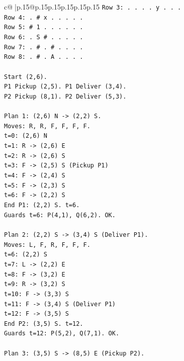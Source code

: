 \documentclass{article}
\begin{document}
{\begin{supertabular}{c@{$\;$}|p{.15\linewidth}@{}p{.15\linewidth}p{.15\linewidth}p{.15\linewidth}p{.15\linewidth}p{.15\linewidth}}
{{{\texttt{Row 3: . . . . y . . .} \\
\texttt{Row 4: . \# x . . . . .} \\
\texttt{Row 5: \# 1 . . . . . .} \\
\texttt{Row 6: . S \# . . . . .} \\
\texttt{Row 7: . \# . \# . . . .} \\
\texttt{Row 8: . \# . A . . . .} \\
\\ 
\texttt{Start (2,6).} \\
\texttt{P1 Pickup (2,5). P1 Deliver (3,4).} \\
\texttt{P2 Pickup (8,1). P2 Deliver (5,3).} \\
\\ 
\texttt{Plan 1: (2,6) N {-}> (2,2) S.} \\
\texttt{Moves: R, R, F, F, F, F.} \\
\texttt{t=0: (2,6) N} \\
\texttt{t=1: R {-}> (2,6) E} \\
\texttt{t=2: R {-}> (2,6) S} \\
\texttt{t=3: F {-}> (2,5) S (Pickup P1)} \\
\texttt{t=4: F {-}> (2,4) S} \\
\texttt{t=5: F {-}> (2,3) S} \\
\texttt{t=6: F {-}> (2,2) S} \\
\texttt{End P1: (2,2) S. t=6.} \\
\texttt{Guards t=6: P(4,1), Q(6,2). OK.} \\
\\ 
\texttt{Plan 2: (2,2) S {-}> (3,4) S (Deliver P1).} \\
\texttt{Moves: L, F, R, F, F, F.} \\
\texttt{t=6: (2,2) S} \\
\texttt{t=7: L {-}> (2,2) E} \\
\texttt{t=8: F {-}> (3,2) E} \\
\texttt{t=9: R {-}> (3,2) S} \\
\texttt{t=10: F {-}> (3,3) S} \\
\texttt{t=11: F {-}> (3,4) S (Deliver P1)} \\
\texttt{t=12: F {-}> (3,5) S} \\
\texttt{End P2: (3,5) S. t=12.} \\
\texttt{Guards t=12: P(5,2), Q(7,1). OK.} \\
\\ 
\texttt{Plan 3: (3,5) S {-}> (8,5) E (Pickup P2).} \\
}}}
\end{supertabular}}
\end{document}
